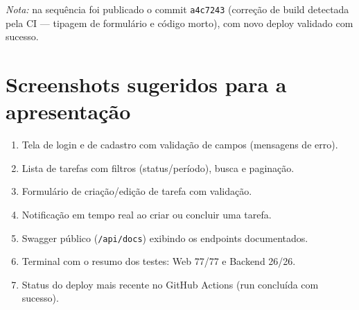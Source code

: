 \documentclass[11pt,a4paper]{article}
\begin{document}
\smallskip
\emph{Nota:} na sequência foi publicado o commit \texttt{a4c7243}
(correção de build detectada pela CI --- tipagem de formulário e código morto),
com novo deploy validado com sucesso.

\section{Screenshots sugeridos para a apresentação}

\begin{enumerate}[leftmargin=1.4em,itemsep=2pt]
  \item Tela de login e de cadastro com validação de campos (mensagens de erro).
  \item Lista de tarefas com filtros (status/período), busca e paginação.
  \item Formulário de criação/edição de tarefa com validação.
  \item Notificação em tempo real ao criar ou concluir uma tarefa.
  \item Swagger público (\texttt{/api/docs}) exibindo os endpoints documentados.
  \item Terminal com o resumo dos testes: Web 77/77 e Backend 26/26.
  \item Status do deploy mais recente no GitHub Actions (run concluída com sucesso).
\end{enumerate}
\end{document}

